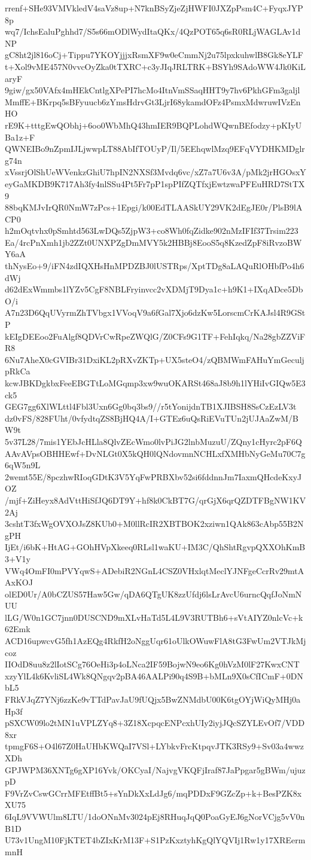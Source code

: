 rrenf+SHe93VMVkledV4saVz8up+N7knBSyZjeZjHWFI0JXZpPsm4C+FyqxJYP8p
wq7/IchsEaluPghhd7/S5s66mODlWydItaQKx/4QzPOT65q6sR0RLjWAGLAv1dNP
gC8ht2jl816oCj+Tippu7YKOYjjjxRsmXF9w0eCmmNj2u75lpxkuhwlB8Gk8eYLF
t+Xol9vME457N0vvcOyZka0tTXRC+c3yJIqJRLTRK+BSYh9SAdoWW4Jk0KiLaryF
9giw/gx50VAfx4mHEkCntlgXPePI7hcMo4ItnVmSSaqHHT9y7hv6PkhGFm3galjl
MmffE+BKrpq5sBFyuucb6zYmsHdrvGt3LjrI68ykamdOFz4PsmxMdwruwIVzEnHO
rE9K+tttgEwQObhj+6oo0WbMhQ43hmIER9BQPLohdWQwnBEfodzy+pKIyUBa1z+F
QWNEIBo9nZpmIJLjwwpLT88AbIfTOUyP/Il/5EEhqwlMzq9EFqVYDHKMDglrg74n
xVssrjOlShUeWVenkzGhiU7hpIN2NXSf3Mvdq6vc/xZ7a7U6v3A/pMk2jrHGOsxY
eyGaMKDB9K717Ah3fy4nlSSu4Pt5Fr7pP1spPIfZQTfxjEwtzwaPFEuHRD7StTX9
88bqKMJvIrQR0NmW7zPcs+1Epgi/k00EdTLAASkUY29VK2dEgJE0r/PlsB9lACP0
h2mOqtvhx0pSmhtd563LwDQs5ZjpW3+co8Wh0fqZidke902nMzIFIf37Trsim223
Ea/4rcPnXmh1jb2ZZt0UNXPZgDmMVY5k2HBBj8EooS5q8KzedZpF8iRvzoBWY6aA
thNysEo+9/iFN4zdIQXHsHnMPDZBJ0lUSTRps/XptTDg8aLAQuRlOHbfPo4h6dWj
d62dExWmmbs1lYZv5CgF8NBLFryinvcc2vXDMjT9Dya1c+h9K1+IXqADce5DbO/i
A7n23D6QqUVyrmZhTVbgx1VVoqV9a6fGal7Xjo6dzKw5LorscmCrKAJsl4R9GStP
kEIgDEEoo2FuAlgf8QDVrCwRpeZWQlG/Z0CFs9G1TF+FehIqkq/Na28gbZZViFR8
6Nu7AheX0cGVIBr31DxiKL2pRXvZKTp+UX5steO4/zQBMWmFAHuYmGeculjpRkCa
kcwJBKDgkbxFeeEBGTtLoMGqmp3xw9wuOKARSt468aJ8b9h1lYHiIvGIQw5E3ck5
GEG7gg6XlWLttl4Fbl3Uxn6Gg0bq3bs9//r5tYonijdnTB1XJIBSH8SsCzEzLV3t
dz0vFS/828FUht/0vfydtqZS8BjHQ4A/I+GTEz6uQsRiEVuTUn2jUJAaZwM/BW9t
5v37L28/7mis1YEbJcHLla8QlvZEcWmo0lvPiJG2lnbMuzuU/ZQny1cHyrc2pF6Q
AAvAVpsOBHHEwf+DvNLGt0X5kQH0lQNdovmnNCHLxfXMHbNyGeMu70C7g6qW5n9L
2wemt55E/8pczhwRIoqGDtK3V5YqFwPRBXbv52si6fddnnJm7IaxmQHcdeKxyJOZ
/mjf+ZiHeyx8AdVttHiSfJQ6DT9Y+hf8k0CkBT7G/qrGjX6qrQZDTFBgNW1KV2Aj
3cshtT3fxWgOVXOJsZ8KUb0+M0llRcIR2XBTBOK2xziwn1QAk863cAbp55B2NgPH
IjEt/i6bK+HtAG+GOhHVpXkeeq0RLsl1waKU+IM3C/QhShtRgvpQXXOhKmB3+V1y
VWq4OmFI0mPVYqwS+ADebiR2NGnL4CSZ0VHxlqtMeclYJNFgeCcrRv29mtAAxKOJ
olED0Ur/A0bCZUS57Haw5Gw/qDA6QTgUK8zzUfdj6lsLrAvcU6urncQqfJoNmNUU
lLG/W0n1GC7jnn0DUSCND9mXLvHaTd5L4L9V3RUTBh6+sVtAIYZ0nlcVc+k62Emk
ACD16upwcvG5fh1AzEQg4RkfH2oNggUqr61oUlkOWuwFlA8tG3FwUm2VTJkMjcoz
IIOdD8uu8z2lIotSCg76OeHi3p4oLNca2IF59BojwN9eo6Kg0hVzM0lF27KwxCNT
xzyYlL4k6KvliSL4Wk8QNgqv2pBA46AALPi90q4S9B+bMLn9X0sCfICmF+0DNbL5
FRkVJqZ7YNj6zzKe9vTTdPavJaU9fUQjx5BwZNMdbU00K6tgOYjWiQyMHj0aHp3f
pSXCW09lo2tMN1uVPLZYq8+3Z18XcpqcENPcxhUIy2iyjJQcSZYLEvOf7/VDD8xr
tpmgF6S+O4l67Z0HaUHbKWQaI7VSl+LYbkvFrcKtpqvJTK3RSy9+Sv03a4wwzXDh
GPJWPM36XNTg6gXP16Yvk/OKCyaI/NajvgVKQFjIraf87JaPpgar5gBWm/ujuzpD
F9VrZvCswGCrrMFEtffBt5+sYnDkXxLdJg6/mqPDDxF9GZcZp+k+BesPZK8xXU75
6IqL9VVWUlm8LTU/1doONnMv3024pEj8RHuqJqQ0PoaGyEJ6gNorVCjg5vV0nB1D
U73v1UngM10FjKTET4bZIxKrM13F+S1PzKxztyhKgQlYQVIj1Rw1y17XREermmnH
